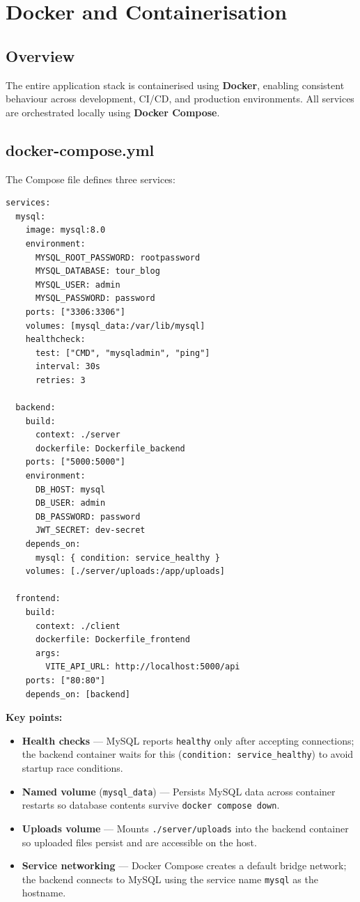 \documentclass[12pt,a4paper]{report}
\begin{document}
\chapter{Docker and Containerisation}

\section{Overview}

The entire application stack is containerised using \textbf{Docker}, enabling consistent behaviour across development, CI/CD, and production environments. All services are orchestrated locally using \textbf{Docker Compose}.

\section{docker-compose.yml}

The Compose file defines three services:

\begin{lstlisting}[caption={docker-compose.yml services}]
services:
  mysql:
    image: mysql:8.0
    environment:
      MYSQL_ROOT_PASSWORD: rootpassword
      MYSQL_DATABASE: tour_blog
      MYSQL_USER: admin
      MYSQL_PASSWORD: password
    ports: ["3306:3306"]
    volumes: [mysql_data:/var/lib/mysql]
    healthcheck:
      test: ["CMD", "mysqladmin", "ping"]
      interval: 30s
      retries: 3

  backend:
    build:
      context: ./server
      dockerfile: Dockerfile_backend
    ports: ["5000:5000"]
    environment:
      DB_HOST: mysql
      DB_USER: admin
      DB_PASSWORD: password
      JWT_SECRET: dev-secret
    depends_on:
      mysql: { condition: service_healthy }
    volumes: [./server/uploads:/app/uploads]

  frontend:
    build:
      context: ./client
      dockerfile: Dockerfile_frontend
      args:
        VITE_API_URL: http://localhost:5000/api
    ports: ["80:80"]
    depends_on: [backend]
\end{lstlisting}

\textbf{Key points:}
\begin{itemize}[leftmargin=2em]
  \item \textbf{Health checks} — MySQL reports \texttt{healthy} only after accepting connections; the backend container waits for this (\texttt{condition: service\_healthy}) to avoid startup race conditions.
  \item \textbf{Named volume} (\texttt{mysql\_data}) — Persists MySQL data across container restarts so database contents survive \texttt{docker compose down}.
  \item \textbf{Uploads volume} — Mounts \texttt{./server/uploads} into the backend container so uploaded files persist and are accessible on the host.
  \item \textbf{Service networking} — Docker Compose creates a default bridge network; the backend connects to MySQL using the service name \texttt{mysql} as the hostname.
\end{itemize}
\end{document}
